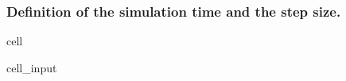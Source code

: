 \documentclass[letterpaper,10pt,english]{jupyterBook}
\begin{document}
\subsubsection{Definition of the simulation time and the step size.}
\label{\detokenize{Aufgabe1:definition-of-the-simulation-time-and-the-step-size}}
\begin{sphinxuseclass}{cell}\begin{sphinxVerbatimInput}

\begin{sphinxuseclass}{cell_input}
\begin{sphinxVerbatim}[commandchars=\\\{\}]
  
  
  
\end{sphinxVerbatim}

\end{sphinxuseclass}\end{sphinxVerbatimInput}

\end{sphinxuseclass}
\end{document}
